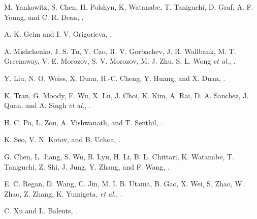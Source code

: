 \documentclass[%
reprint,
amsmath,amssymb,amsfonts
aps,
superscriptaddress,
prx
]{revtex4-1}
\begin{document}
\begin{thebibliography}{99}
 M. Yankowitz, S. Chen, H. Polshyn, K. Watanabe, T. Taniguchi, D. Graf, A. F. Young, and C. R. Dean, 
\href{https://doi.org/10.1126/science.aav1910}{}.


 A. K. Geim and I. V. Grigorieva, 
\href{https://doi.org/10.1038/nature12385}{}.

 A. Mishchenko, J. S. Tu, Y. Cao, R. V. Gorbachev, J. R. Wallbank, M. T. Greenaway, V. E. Morozov, S. V. Morozov, M. J. Zhu, S. L. Wong \textit{et al.}, 
\href{https://doi.org/10.1038/nnano.2014.187}{}.

 Y. Liu, N. O. Weiss, X. Duan, H.-C. Cheng, Y. Huang, and X. Duan, 
\href{https://doi.org/10.1038/natrevmats.2016.42}{}.

 K. Tran, G. Moody, F. Wu, X. Lu, J. Choi, K. Kim, A. Rai, D. A. Sanchez, J. Quan, and A. Singh \textit{et al.}, 
\href{https://doi.org/10.1038/s41586-019-0975-z}{}.


 H. C. Po, L. Zou, A. Vishwanath, and T. Senthil, 
\href{https://doi.org/10.1103/PhysRevX.8.031089}{}. 

 K. Seo, V. N. Kotov, and B. Uchoa, 
\href{https://doi.org/10.1103/PhysRevLett.122.246402}{}. 

 G. Chen, L. Jiang, S. Wu, B. Lyu, H. Li, B. L. Chittari, K. Watanabe, T. Taniguchi, Z. Shi, J. Jung, Y. Zhang, and F. Wang, 
\href{https://doi.org/10.1038/s41567-018-0387-2}{}. 

 E. C. Regan, D. Wang, C. Jin, M. I. B. Utama, B. Gao, X. Wei, S. Zhao, W. Zhao, Z. Zhang, K. Yumigeta, \textit{et al.},
\href{https://doi.org/10.1038/s41586-020-2092-4}{}. 


 C. Xu and L. Balents, 
\href{https://doi.org/10.1103/PhysRevLett.121.087001}{}.


\end{thebibliography}
\end{document}
